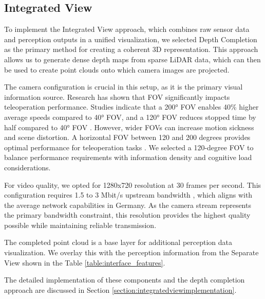 \subsection{Integrated View}
To implement the Integrated View approach, which combines raw sensor data and perception outputs in a unified visualization, we selected Depth Completion as the primary method for creating a coherent 3D representation. This approach allows us to generate dense depth maps from sparse \ac{LiDAR} data, which can then be used to create point clouds onto which camera images are projected.

The camera configuration is crucial in this setup, as it is the primary visual information source. Research has shown that \ac{FOV} significantly impacts teleoperation performance. Studies indicate that a 200° FOV enables 40\% higher average speeds compared to 40° FOV, and a 120° FOV reduces stopped time by half compared to 40° FOV \cite{fovConsiderations}. However, wider FOVs can increase motion sickness and scene distortion. A horizontal FOV between 120 and 200 degrees provides optimal performance for teleoperation tasks \cite{fovConsiderations}. We selected a 120-degree FOV to balance performance requirements with information density and cognitive load considerations.

For video quality, we opted for 1280x720 resolution at 30 frames per second. This configuration requires 1.5 to 3 Mbit/s upstream bandwidth \cite{vdocipher2024bandwidth}, which aligns with the average network capabilities in Germany. As the camera stream represents the primary bandwidth constraint, this resolution provides the highest quality possible while maintaining reliable transmission.

The completed point cloud is a base layer for additional perception data visualization. We overlay this with the perception information from the Separate View shown in the Table \ref{table:interface_features}.

The detailed implementation of these components and the depth completion approach are discussed in Section \ref{section:integratedviewimplementation}.

